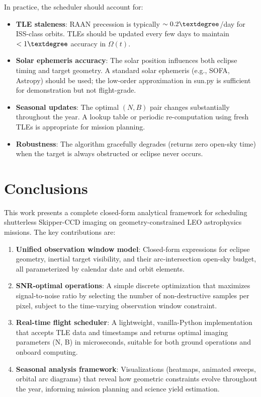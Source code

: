 \documentclass[preprint,12pt]{elsarticle}
\theoremstyle{definition}
\theoremstyle{remark}
\begin{document}
In practice, the scheduler should account for:
\begin{itemize}
\item \textbf{TLE staleness}: RAAN precession is typically $\sim 0.2\textdegree$/day for ISS-class orbits. TLEs should be updated every few days to maintain $<1\textdegree$ accuracy in $\Omega(t)$.

\item \textbf{Solar ephemeris accuracy}: The solar position influences both eclipse timing and target geometry. A standard solar ephemeris (e.g., SOFA, Astropy) should be used; the low-order approximation in sun.py is sufficient for demonstration but not flight-grade.

\item \textbf{Seasonal updates}: The optimal $(N, B)$ pair changes substantially throughout the year. A lookup table or periodic re-computation using fresh TLEs is appropriate for mission planning.

\item \textbf{Robustness}: The algorithm gracefully degrades (returns zero open-sky time) when the target is always obstructed or eclipse never occurs.
\end{itemize}

\section{Conclusions}

This work presents a complete closed-form analytical framework for scheduling shutterless Skipper-CCD imaging on geometry-constrained LEO astrophysics missions.
The key contributions are:

\begin{enumerate}
\item \textbf{Unified observation window model}: Closed-form expressions for eclipse geometry, inertial target visibility, and their arc-intersection open-sky budget, all parameterized by calendar date and orbit elements.

\item \textbf{SNR-optimal operations}: A simple discrete optimization that maximizes signal-to-noise ratio by selecting the number of non-destructive samples per pixel, subject to the time-varying observation window constraint.

\item \textbf{Real-time flight scheduler}: A lightweight, vanilla-Python implementation that accepts TLE data and timestamps and returns optimal imaging parameters (N, B) in microseconds, suitable for both ground operations and onboard computing.

\item \textbf{Seasonal analysis framework}: Visualizations (heatmaps, animated sweeps, orbital arc diagrams) that reveal how geometric constraints evolve throughout the year, informing mission planning and science yield estimation.
\end{enumerate}
\end{document}
